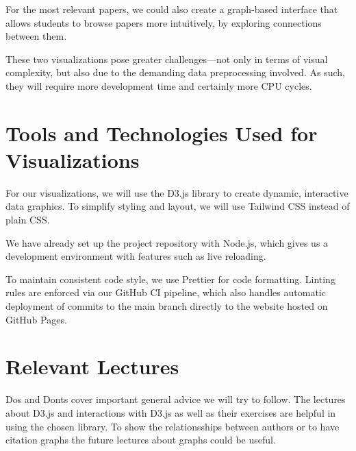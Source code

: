 \documentclass{article}
\begin{document}
For the most relevant papers, we could also create a graph-based interface that allows students to browse papers more intuitively, by exploring connections between them.

These two visualizations pose greater challenges—not only in terms of visual complexity, but also due to the demanding data preprocessing involved.
As such, they will require more development time and certainly more CPU cycles.

\section{Tools and Technologies Used for Visualizations}
For our visualizations, we will use the D3.js library to create dynamic, interactive data graphics.
To simplify styling and layout, we will use Tailwind CSS instead of plain CSS.

We have already set up the project repository with Node.js, which gives us a development environment with features such as live reloading.

To maintain consistent code style, we use Prettier for code formatting.
Linting rules are enforced via our GitHub CI pipeline, which also handles automatic deployment of commits to the main branch directly to the website hosted on GitHub Pages.

\section{Relevant Lectures}
Dos and Donts cover important general advice we will try to follow.
The lectures about D3.js and interactions with D3.js as well as their exercises are helpful in using the chosen library.
To show the relationsships between authors or to have citation graphs the future lectures about graphs could be useful.
\end{document}
